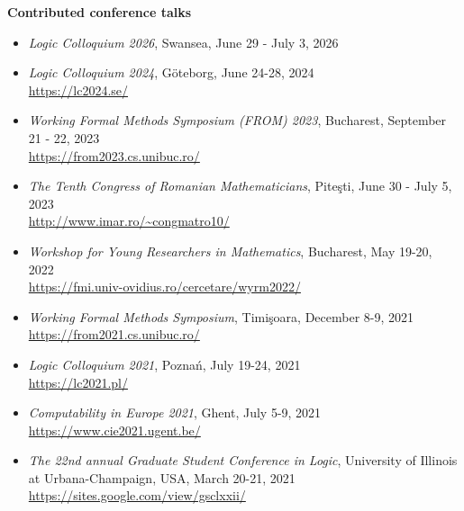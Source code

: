 \documentclass[letterpaper,11pt,oneside]{article}
\begin{document}
\noindent
\large{\textbf{Contributed conference talks}}
\normalsize
\begin{itemize}
    \item \emph{Logic Colloquium 2026},
    Swansea, June 29 - July 3, 2026
    \item \emph{Logic Colloquium 2024},
    G\"{o}teborg, June 24-28, 2024 \\ 
    \url{https://lc2024.se/}
    \item \emph{Working Formal Methods Symposium (FROM) 2023}, 
    Bucharest, September 21 - 22, 2023 \\ 
    \url{https://from2023.cs.unibuc.ro/}
    \item \emph{The Tenth Congress of Romanian Mathematicians},
    Pite\c{s}ti, June 30 - July 5, 2023 \\ 
    \url{http://www.imar.ro/~congmatro10/}
    \item \emph{Workshop for Young Researchers in Mathematics},
    Bucharest, May 19-20, 2022 \\
    \url{https://fmi.univ-ovidius.ro/cercetare/wyrm2022/}
    \item \emph{Working Formal Methods Symposium},
    Timi\c{s}oara, December 8-9, 2021 \\
    \url{https://from2021.cs.unibuc.ro/}
    \item \emph{Logic Colloquium 2021}, 
    Pozna\'n, July 19-24, 2021 \\ 
    \url{https://lc2021.pl/}
    \item \emph{Computability in Europe 2021}, 
    Ghent, July 5-9, 2021 \\ 
    \url{https://www.cie2021.ugent.be/}
    \item \emph{The 22nd annual Graduate Student Conference in Logic}, 
    University of Illinois at Urbana-Champaign, 
    USA, March 20-21, 2021 \\ 
    \url{https://sites.google.com/view/gsclxxii/}
\end{itemize}
\mbox{}
\end{document}
